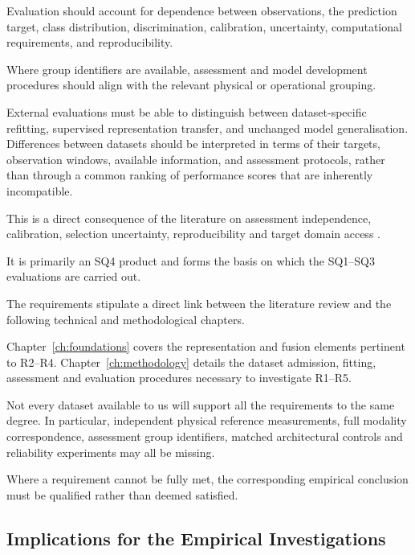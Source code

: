 Evaluation should account for dependence between observations, the prediction target, class
distribution, discrimination, calibration, uncertainty, computational requirements, and
reproducibility.

Where group identifiers are available, assessment and model development procedures should align with
the relevant physical or operational grouping.

External evaluations must be able to distinguish between dataset-specific refitting, supervised
representation transfer, and unchanged model generalisation. Differences between datasets should be
interpreted in terms of their targets, observation windows, available information, and assessment
protocols, rather than through a common ranking of performance scores that are inherently
incompatible.

This is a direct consequence of the literature on assessment independence, calibration, selection
uncertainty, reproducibility and target domain access
\parencite{P004,P017,Guo2017Calibration,P008,Bengio2004CVVariance,P009}.

It is primarily an SQ4 product and forms the basis on which the SQ1--SQ3 evaluations are carried
out.

The requirements stipulate a direct link between the literature review and the following technical
and methodological chapters.

Chapter~\ref{ch:foundations} covers the representation and fusion elements pertinent to R2--R4.
Chapter~\ref{ch:methodology} details the dataset admission, fitting, assessment and evaluation
procedures necessary to investigate R1--R5.

Not every dataset available to us will support all the requirements to the same degree. In
particular, independent physical reference measurements, full modality correspondence, assessment
group identifiers, matched architectural controls and reliability experiments may all be missing.

Where a requirement cannot be fully met, the corresponding empirical conclusion must be qualified
rather than deemed satisfied.

\subsection{Implications for the Empirical Investigations}

\label{sec:literature-study-gaps}

